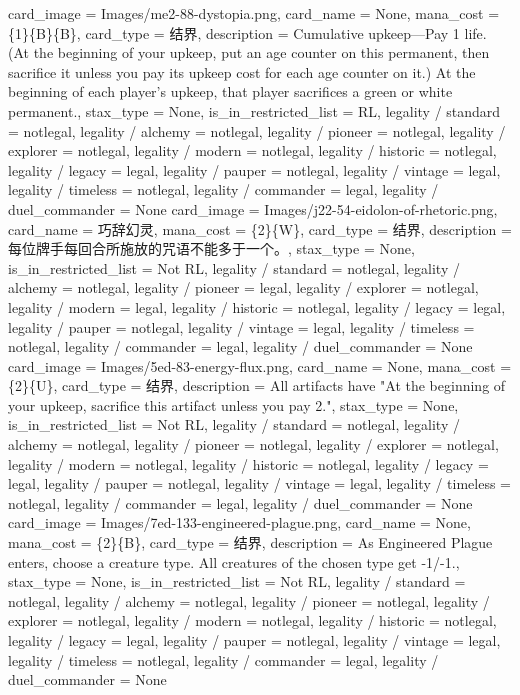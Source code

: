 \documentclass[lang = cn, color = black, 10pt]{AllThatStax}
\begin{document}
{
	card_image = Images/me2-88-dystopia.png,
	card_name = None,
	mana_cost = \{1\}\{B\}\{B\},
	card_type = 结界,
	description = Cumulative upkeep—Pay 1 life. (At the beginning of your upkeep, put an age counter on this permanent, then sacrifice it unless you pay its upkeep cost for each age counter on it.)
	At the beginning of each player's upkeep, that player sacrifices a green or white permanent.,
	stax_type = None,
	is_in_restricted_list = RL,
	legality / standard = notlegal,
	legality / alchemy = notlegal,
	legality / pioneer = notlegal,
	legality / explorer = notlegal,
	legality / modern = notlegal,
	legality / historic = notlegal,
	legality / legacy = legal,
	legality / pauper = notlegal,
	legality / vintage = legal,
	legality / timeless = notlegal,
	legality / commander = legal,
	legality / duel_commander = None
}
\card
{
	card_image = Images/j22-54-eidolon-of-rhetoric.png,
	card_name = 巧辞幻灵,
	mana_cost = \{2\}\{W\},
	card_type = 结界,
	description = 每位牌手每回合所施放的咒语不能多于一个。,
	stax_type = None,
	is_in_restricted_list = Not RL,
	legality / standard = notlegal,
	legality / alchemy = notlegal,
	legality / pioneer = legal,
	legality / explorer = notlegal,
	legality / modern = legal,
	legality / historic = notlegal,
	legality / legacy = legal,
	legality / pauper = notlegal,
	legality / vintage = legal,
	legality / timeless = notlegal,
	legality / commander = legal,
	legality / duel_commander = None
}
\card
{
	card_image = Images/5ed-83-energy-flux.png,
	card_name = None,
	mana_cost = \{2\}\{U\},
	card_type = 结界,
	description = All artifacts have "At the beginning of your upkeep, sacrifice this artifact unless you pay {2}.",
	stax_type = None,
	is_in_restricted_list = Not RL,
	legality / standard = notlegal,
	legality / alchemy = notlegal,
	legality / pioneer = notlegal,
	legality / explorer = notlegal,
	legality / modern = notlegal,
	legality / historic = notlegal,
	legality / legacy = legal,
	legality / pauper = notlegal,
	legality / vintage = legal,
	legality / timeless = notlegal,
	legality / commander = legal,
	legality / duel_commander = None
}
\card
{
	card_image = Images/7ed-133-engineered-plague.png,
	card_name = None,
	mana_cost = \{2\}\{B\},
	card_type = 结界,
	description = As Engineered Plague enters, choose a creature type.
	All creatures of the chosen type get -1/-1.,
	stax_type = None,
	is_in_restricted_list = Not RL,
	legality / standard = notlegal,
	legality / alchemy = notlegal,
	legality / pioneer = notlegal,
	legality / explorer = notlegal,
	legality / modern = notlegal,
	legality / historic = notlegal,
	legality / legacy = legal,
	legality / pauper = notlegal,
	legality / vintage = legal,
	legality / timeless = notlegal,
	legality / commander = legal,
	legality / duel_commander = None
}
\end{document}
